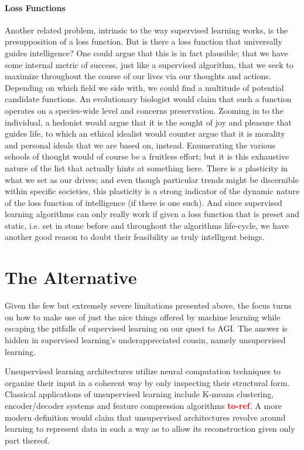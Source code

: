 \documentclass[]{article}
\newcommand\toref{\textcolor{red}{\bf{to-ref}}}
\begin{document}
\paragraph{Loss Functions}
Another related problem, intrinsic to the way supervised learning works, is the presupposition of a loss function. But is there a loss function that universally guides intelligence? One could argue that this is in fact plausible; that we have some internal metric of success, just like a supervised algorithm, that we seek to maximize throughout the course of our lives via our thoughts and actions. Depending on which field we side with, we could find a multitude of potential candidate functions. An evolutionary biologist would claim that such a function operates on a species-wide level and concerns preservation. Zooming in to the individual, a hedonist would argue that it is the sought of joy and pleasure that guides life, to which an ethical idealist would counter argue that it is morality and personal ideals that we are based on, instead. Enumerating the various schools of thought would of course be a fruitless effort; but it is this exhaustive nature of the list that actually hints at something here. There is a plasticity in what we set as our drives; and even though particular trends might be discernible within specific societies, this plasticity is a strong indicator of the dynamic nature of the loss function of intelligence (if there is one such). And since supervised learning algorithms can only really work if given a loss function that is preset and static, i.e. set in stone before and throughout the algorithms life-cycle, we have another good reason to doubt their feasibility as truly intelligent beings.

\section{The Alternative}
Given the few but extremely severe limitations presented above, the focus turns on how to make use of just the nice things offered by machine learning while escaping the pitfalls of supervised learning on our quest to AGI. The answer is hidden in supervised learning's underappreciated cousin, namely unsupervised learning.

Unsupervised learning architectures utilize neural computation techniques to organize their input in a coherent way by only inspecting their structural form. Classical applications of unsupervised learning include K-means clustering, encoder/decoder systems and feature compression algorithms \toref . A more modern definition would claim that unsupervised architectures revolve around learning to represent data in such a way as to allow its reconstruction given only part thereof.
\end{document}
